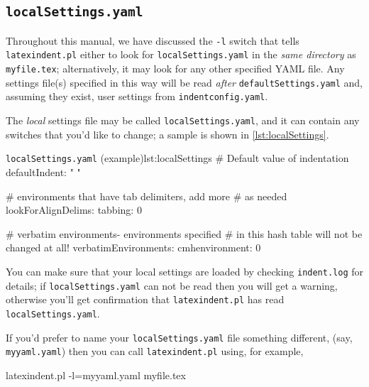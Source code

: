 \subsection{\texttt{localSettings.yaml}}\label{sec:localsettings}
	Throughout this manual, we have discussed the \texttt{-l} switch
	that tells \texttt{latexindent.pl} either to look for \texttt{localSettings.yaml} in the
	\emph{same directory} as \texttt{myfile.tex}; alternatively, it may look for any
	other specified YAML file. Any settings file(s) specified in this way will
	be read \emph{after} \texttt{defaultSettings.yaml} and, assuming they exist,
	user settings from \texttt{indentconfig.yaml}.

	The \emph{local} settings file may be called \texttt{localSettings.yaml}, and
	it can contain any switches that you'd
	like to change; a sample is shown in \cref{lst:localSettings}.

	\begin{yaml}{\texttt{localSettings.yaml} (example)}{lst:localSettings}
	# Default value of indentation
	defaultIndent: " "

	# environments that have tab delimiters, add more
	# as needed
	lookForAlignDelims:
	tabbing: 0

	#  verbatim environments- environments specified
	#  in this hash table will not be changed at all!
	verbatimEnvironments:
	cmhenvironment: 0
\end{yaml}


	You can make sure that your local settings are loaded by checking \texttt{indent.log}
	for details; if \texttt{localSettings.yaml} can not be read then you will
	get a warning, otherwise you'll get confirmation that
	\texttt{latexindent.pl} has read \texttt{localSettings.yaml}.

	If you'd prefer to name your \texttt{localSettings.yaml} file something different, (say, \texttt{myyaml.yaml}) then
	you can call \texttt{latexindent.pl} using, for example,
	\begin{commandshell}
latexindent.pl -l=myyaml.yaml myfile.tex
\end{commandshell}

